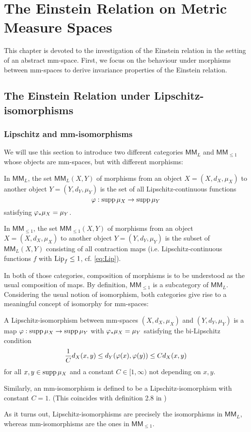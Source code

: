 \chapter{The Einstein Relation on Metric Measure Spaces}

This chapter is devoted to the investigation of the Einstein relation in the setting of an abstract mm-space. First, we focus on the behaviour under morphisms between mm-spaces to derive invariance properties of the Einstein relation. 

\section{The Einstein Relation under Lipschitz-isomorphisms}

\subsection{Lipschitz and mm-isomorphisms}

We will use this section to introduce two different categories $\mathsf{MM}_L$ and $\mathsf{MM}_{\leq1}$ whose objects are mm-spaces, but with different morphisms: 
\begin{compactitem}
  \item In $\mathsf{MM}_L$, the set $\mathsf{MM}_L(X,Y)$ of morphisms from an object $X=(X,d_X,\mu_X)$ to another object $Y=(Y,d_Y,\mu_Y)$ is the set of all Lipschitz-continuous functions 
  \[ 
    \varphi:\operatorname{supp}\mu_X\to\operatorname{supp}\mu_Y
  \]
  satisfying $\varphi_*\mu_X=\mu_Y$.
  \item In $\mathsf{MM}_{\leq1}$, the set $\mathsf{MM}_{\leq1}(X,Y)$ of morphisms from an object $X=(X,d_X,\mu_X)$ to another object $Y=(Y,d_Y,\mu_Y)$ is the subset of $\mathsf{MM}_L(X,Y)$ consisting of all contraction maps (i.e. Lipschitz-continuous functions $f$ with $\operatorname{Lip}_f\leq1$, cf. \eqref{eq:Lip}).
\end{compactitem}
In both of those categories, composition of morphisms is to be understood as the usual composition of maps. By definition, $\mathsf{MM}_{\leq1}$ is a subcategory of $\mathsf{MM}_L$. Considering the usual notion of isomorphism, both categories give rise to a meaningful concept of isomorphy for mm-spaces: 
\begin{defin}
  A Lipschitz-isomorphism between mm-spaces $(X,d_X,\mu_X)$ and $(Y,d_Y,\mu_Y)$ is a map 
  $\varphi:\operatorname{supp}\mu_X\to\operatorname{supp}\mu_Y$ with $\varphi_*\mu_X=\mu_Y$ satisfying the bi-Lipschitz condition
  \[
    \frac{1}{C}d_X(x,y)\leq d_Y(\varphi(x),\varphi(y))\leq Cd_X(x,y)
  \]
  for all $x,y\in\operatorname{supp}\mu_X$ and a constant $C\in[1,\infty)$ not depending on $x,y$.
  
  Similarly, an mm-isomorphism is defined to be a Lipschitz-isomorphism with constant $C=1$. (This coincides with definition 2.8 in \cite{shioya2016metric})
\end{defin}
As it turns out, Lipschitz-isomorphisms are precisely the isomorphisms in $\mathsf{MM}_L$, whereas mm-isomorphisms are the ones in $\mathsf{MM}_{\leq1}$.

